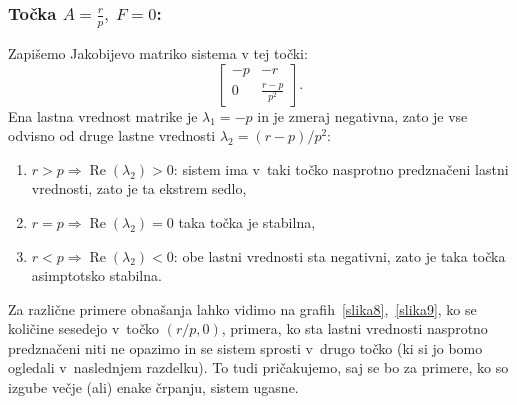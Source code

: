 \documentclass[a4paper,pdftex,10pt]{article}
\numberwithin{equation}{section} %
\numberwithin{figure}{section} %
\numberwithin{table}{section} %
\begin{document}
\subsubsection*{Točka $A=\frac{r}{p},\; F=0$:}
Zapišemo Jakobijevo matriko sistema v tej točki: 
\begin{equation}
    \begin{bmatrix}
	-p & -r \\
	0 & \frac{r-p}{p^2}
    \end{bmatrix}.
\end{equation}
Ena lastna vrednost matrike je $\lambda_1=-p$ in je zmeraj negativna, zato je vse odvisno
od druge lastne vrednosti $\lambda_2= (r-p)/p^2$:
\begin{enumerate}
    \item $r>p \Rightarrow \operatorname{Re}(\lambda_2)>0$: sistem ima v~taki točko 
	nasprotno predznačeni lastni vrednosti, zato je ta ekstrem sedlo, 
    \item $r=p \Rightarrow \operatorname{Re}(\lambda_2)=0$ taka točka je stabilna,
    \item $r<p \Rightarrow \operatorname{Re}(\lambda_2)<0$: obe lastni vrednosti sta 
	negativni, zato je taka točka asimptotsko stabilna.
\end{enumerate}
Za različne primere obnašanja lahko vidimo na grafih~\ref{slika8},~\ref{slika9}, ko se 
količine sesedejo v~točko $(r/p,0)$, primera, ko sta lastni vrednosti nasprotno 
predznačeni niti ne opazimo in se sistem sprosti v~drugo točko (ki si jo bomo ogledali 
v~naslednjem razdelku). To tudi pričakujemo, saj se bo za primere, ko so izgube večje (ali)
enake črpanju, sistem ugasne. 
\end{document}
